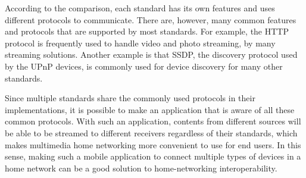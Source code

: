 According to the comparison, each standard has its own features and uses 
different protocols to communicate. There are, however, many common features
and protocols that are supported by most standards. For example, the HTTP
protocol is frequently used to handle video and photo streaming, by many
streaming solutions. Another example is that SSDP, the discovery protocol used
by the UPnP devices, is commonly used for device discovery for many other
standards.

Since multiple standards share the commonly used protocols in their
implementations, it is possible to make an application that is aware of all
these common protocols. With such an application, contents from
different sources will be able to be streamed to different receivers regardless
of their standards, which makes multimedia home networking more convenient to
use for end users. In this sense, making such a mobile application to connect
multiple types of devices in a home network can be a good solution to home-networking
interoperability.